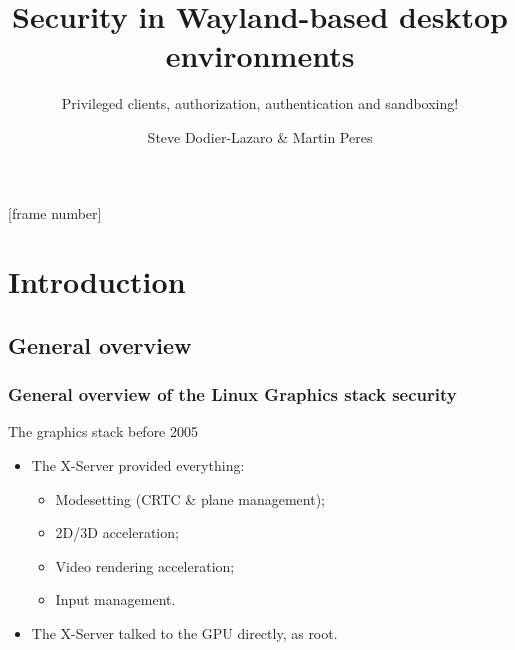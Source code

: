 \documentclass[11pt,english,compress]{beamer}
\title{Security in Wayland-based desktop environments}
\subtitle{Privileged clients, authorization, authentication and sandboxing!}
\author{Steve Dodier-Lazaro \& Martin Peres}
\institute{PhD student at UCL \& LaBRI}
\begin{document}
[frame number]

\begin{frame}
	\titlepage
\end{frame}

\section{Introduction}
\subsection{General overview}
\begin{frame}
	\frametitle{General overview of the Linux Graphics stack security}

	\begin{block}{The graphics stack before 2005}
		\begin{itemize}
			\item The X-Server provided everything:
			\begin{itemize}
				\item Modesetting (CRTC \& plane management);
				\item 2D/3D acceleration;
				\item Video rendering acceleration;
				\item Input management.
			\end{itemize}
			\item The X-Server talked to the GPU directly, as root.
		\end{itemize}
	\end{block}
\end{frame}

\end{document}
